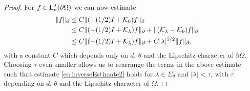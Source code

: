 \begin{proof}
  For $f \in \mathrm{L}^2_n(\partial\Omega)$ we can now estimate
  \begin{align*}
    \| f\|_\partial 
    &\leq C \|(-(1/2)I + \mathcal{K}_0) f \|_\partial  \\
    &\leq C \|(-(1/2)I + \mathcal{K}_\lambda)f \|_\partial + \|(\mathcal{K}_\lambda - \mathcal{K}_0)f\|_\partial \\
    &\leq C \|(-(1/2)I + \mathcal{K}_\lambda)f\|_\partial + C |\lambda|^{1/2} \|f\|_\partial,
  \end{align*}
  with a constant $C$ which depends only on $d$, $\theta$ and the Lipschitz character of $\partial\Omega$.
  Choosing $\tau$ even smaller allows us to rearrange the terms in the above estimate such that estimate \eqref{eq:inverseEstimate2} holds for $\lambda \in \Sigma_\theta$ and $|\lambda| < \tau$, with $\tau$ depending on $d$, $\theta$ and the Lipschitz character of $\Omega$.


\end{proof}
